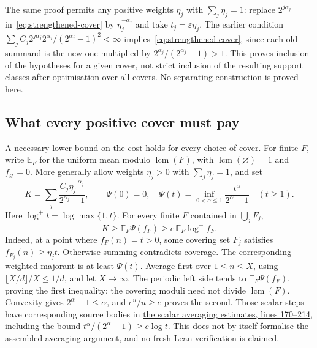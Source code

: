 \documentclass[11pt]{article}
\begin{document}
The same proof permits any positive weights $\eta_j$ with $\sum_j\eta_j=1$:
replace $2^{j\alpha_j}$ in~\eqref{eq:strengthened-cover} by
$\eta_j^{-\alpha_j}$ and take $t_j=\varepsilon\eta_j$.
The earlier condition
$\sum_jC_j2^{j\alpha_j}2^{\alpha_j}/(2^{\alpha_j}-1)^2<\infty$
implies~\eqref{eq:strengthened-cover}, since each old summand is the
new one multiplied by $2^{\alpha_j}/(2^{\alpha_j}-1)>1$.
This proves inclusion of the hypotheses for a given cover, not strict
inclusion of the resulting support classes after optimisation over
all covers.  No separating construction is proved here.

\subsection{What every positive cover must pay}
A necessary lower bound on the cost holds for every choice of cover.  For finite $F$, write
$\mathbb E_F$ for the uniform mean modulo $\operatorname{lcm}(F)$,
with $\operatorname{lcm}(\varnothing)=1$ and $f_{\varnothing}=0$.
More generally allow weights $\eta_j>0$ with $\sum_j\eta_j=1$, and set
\[
 K=\sum_j\frac{C_j\eta_j^{-\alpha_j}}{2^{\alpha_j}-1},\qquad
 \Psi(0)=0,\quad
 \Psi(t)=\inf_{0<\alpha\le1}\frac{t^\alpha}{2^\alpha-1}\quad(t\ge1).
\]
Here $\log^+t=\log\max\{1,t\}$.  For every finite $F$ contained in
$\bigcup_jF_j$,
\begin{equation}
 K\ge\mathbb E_F\Psi(f_F)\ge e\,\mathbb E_F\log^+f_F.
 \label{eq:cover-log-obstruction}
\end{equation}
Indeed, at a point where $f_F(n)=t>0$, some covering set $F_j$ satisfies
$f_{F_j}(n)\ge\eta_jt$.  Otherwise summing contradicts coverage.
The corresponding weighted majorant is at least $\Psi(t)$.
Average first over $1\le n\le X$, using
$\lfloor X/d\rfloor/X\le1/d$, and let $X\to\infty$.
The periodic left side tends to $\mathbb E_F\Psi(f_F)$, proving
the first inequality; the covering moduli need not divide
$\operatorname{lcm}(F)$.  Convexity gives $2^\alpha-1\le\alpha$, and
$e^u/u\ge e$ proves the second.  Those scalar steps have corresponding source bodies in
\href{https://github.com/wcook04/plectis-erdos-lean/blob/52f29ad173b04e3bac941b3663f2b9aebe5de0bb/ErdosProblems/Erdos257/PaperCompleteR7/CoverKernel.lean#L170}{the scalar averaging estimates, lines 170--214},
including the bound $t^\alpha/(2^\alpha-1)\ge e\log t$.
This does not by itself formalise the assembled averaging argument, and
no fresh Lean verification is claimed.
\end{document}
